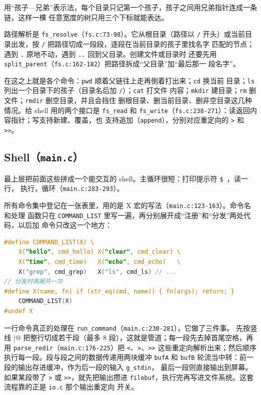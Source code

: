 \documentclass[12pt, a4paper]{ctexart}
\begin{document}
用“孩子—兄弟”表示法，每个目录只记第一个孩子，孩子之间用兄弟指针连成一条链，这样一棵
任意宽度的树只用三个下标就能表达。

路径解析是 \lstinline|fs_resolve|（\lstinline|fs.c:73-98|）。它从根目录（路径以 \lstinline|/|
开头）或当前目录出发，按 \lstinline|/| 把路径切成一段段，逐段在当前目录的孩子里找名字
匹配的节点；遇到 \lstinline|.| 原地不动，遇到 \lstinline|..| 回到父目录。创建文件或目录时
还要先用 \lstinline|split_parent|（\lstinline|fs.c:162-182|）把路径拆成“父目录”加“最后那一
段名字”。

在这之上就是各个命令：\lstinline|pwd| 顺着父链往上走再倒着打出来；\lstinline|cd| 换当前
目录；\lstinline|ls| 列出一个目录下的孩子（目录名后加 \lstinline|/|）；\lstinline|cat| 打文件
内容；\lstinline|mkdir| 建目录；\lstinline|rm| 删文件；\lstinline|rmdir| 删空目录，并且会挡住
删根目录、删当前目录、删非空目录这几种情况。给 shell 用的两个接口是 \lstinline|fs_read|
和 \lstinline|fs_write|（\lstinline|fs.c:238-271|）：读返回内容指针；写支持新建、覆盖，也
支持追加（\lstinline|append|），分别对应重定向的 \lstinline|>| 和 \lstinline|>>|。

\subsection{Shell（\texttt{main.c}）}

最上层把前面这些拼成一个能交互的 shell。主循环很短：打印提示符 \lstinline|$ |，读一行，
执行，循环（\lstinline|main.c:283-293|）。

所有命令集中登记在一张表里，用的是 X 宏的写法（\lstinline|main.c:123-163|）。命令名和处理
函数只在 \lstinline|COMMAND_LIST| 里写一遍，再分别展开成“注册”和“分发”两处代码，以后加
命令只改这一个地方：

\begin{lstlisting}[language=C]
#define COMMAND_LIST(X) \
    X("hello", cmd_hello) X("clear", cmd_clear) \
    X("time", cmd_time)   X("echo", cmd_echo)   \ 
    X("grep", cmd_grep)   X("ls", cmd_ls) // ...
// 分发时再展开一次
#define X(name, fn) if (str_eq(cmd, name)) { fn(args); return; }
    COMMAND_LIST(X)
#undef X
\end{lstlisting}

一行命令真正的处理在 \lstinline|run_command|（\lstinline|main.c:230-281|），它做了三件事。
先按竖线 \lstinline@|@ 把整行切成若干段（最多 8 段），这就是管道；每一段先去掉首尾空格，再用
\lstinline|parse_redir|（\lstinline|main.c:176-225|）把 \lstinline|<|、\lstinline|>|、\lstinline|>>|
这些重定向解析出来；然后顺序执行每一段。段与段之间的数据传递用两块缓冲 \lstinline|bufA|
和 \lstinline|bufB| 轮流当中转：前一段的输出存进缓冲，作为后一段的输入 \lstinline|g_stdin|，
最后一段则直接输出到屏幕。如果某段带了 \lstinline|>| 或 \lstinline|>>|，就先把输出攒进
\lstinline|filebuf|，执行完再写进文件系统。这套流程靠的正是 \lstinline|io.c| 那个输出重定向
开关。
\end{document}
